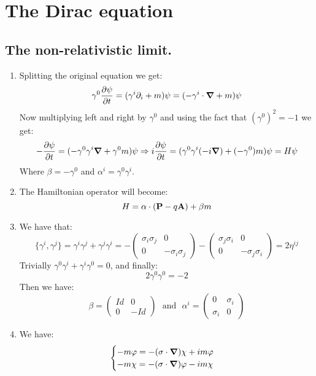 \documentclass[10pt,a4paper]{book}
\begin{document}
\chapter{The Dirac equation}

\section{The non-relativistic limit.}

\begin{enumerate}

\item Splitting the original equation we get:
\[
\gamma^0 \pdv{ \psi }{t} = (\gamma^i \partial_i + m)\psi  = ( - \gamma^i \cdot \grad + m ) \psi 
\]
Now multiplying left and right by $\gamma^0$ and using the fact that $(\gamma^0)^2 = - 1$ we get:
\[
-\pdv{\psi}{t} = (- \gamma^0 \gamma^{i} \grad + \gamma^0 m) \psi  \Rightarrow i \pdv{\psi}{t} = (\gamma^0 \gamma^i (- i \grad) + (-\gamma^0) m) \psi = H \psi
\]
Where $\beta = -\gamma^0$ and $\alpha^i = \gamma^0 \gamma^i$.

\item The Hamiltonian operator will become:
\[
H = \vb{\alpha} \cdot (\vb{P} - q \vb{A}) + \beta m
\]

\item We have that:
\[
\{ \gamma^i, \gamma^j \} = \gamma^i \gamma^j + \gamma^j \gamma^i = - \begin{pmatrix}
\sigma_i \sigma_j & 0\\
0 & - \sigma_i \sigma_j
\end{pmatrix} - \begin{pmatrix}
\sigma_j \sigma_i & 0\\
0 & - \sigma_j \sigma_i
\end{pmatrix}  =  2 \eta^{ij}
\]
Trivially $\gamma^0\gamma^i + \gamma^i \gamma^0 = 0$, and finally:
\[
2 \gamma^0 \gamma^0 = - 2
\]
Then we have:
\[
\beta = \begin{pmatrix}
Id & 0 \\
0 & - Id
\end{pmatrix}
\mbox{~~and~~}
\alpha^i = \begin{pmatrix}
0 & \sigma_i\\
\sigma_i & 0
\end{pmatrix}
\]

\item We have:
\[
\begin{cases}

- m \varphi = -(\vb{\sigma} \cdot \grad) \chi + i m \varphi\\

-m \chi = - (\vb{\sigma} \cdot \grad) \varphi - im \chi 
\end{cases}
\]

\end{enumerate}
\end{document}
